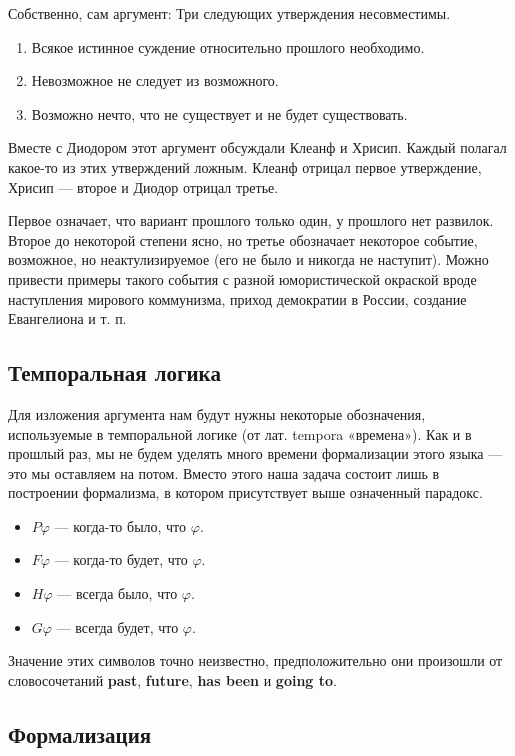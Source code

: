 \documentclass[openany]{book}
\theoremstyle{plain}
\theoremstyle{definition}
\begin{document}
Собственно, сам аргумент:
Три следующих утверждения несовместимы.
\begin{enumerate}
\item Всякое истинное суждение относительно прошлого необходимо.
\item Невозможное не следует из возможного.
\item Возможно нечто, что не существует и не будет существовать.
\end{enumerate}

Вместе с Диодором этот аргумент обсуждали Клеанф и Хрисип. Каждый полагал какое-то из этих утверждений ложным. Клеанф отрицал первое утверждение, Хрисип --- второе и Диодор отрицал третье.

Первое означает, что вариант прошлого только один, у прошлого нет развилок. Второе до некоторой степени ясно, но третье обозначает некоторое событие, возможное, но неактулизируемое (его не было и никогда не наступит). Можно привести примеры такого события с разной юмористической окраской вроде наступления мирового коммунизма, приход демократии в России, создание Евангелиона и т. п.

\subsection{ Темпоральная логика }

Для изложения аргумента нам будут нужны некоторые обозначения, используемые в темпоральной логике (от лат. tempora «времена»). Как и в прошлый раз, мы не будем уделять много времени формализации этого языка — это мы оставляем на потом. Вместо этого наша задача состоит лишь в построении формализма, в котором присутствует выше означенный парадокс.

\begin{itemize}
\item \(P\varphi\) — когда-то было, что \(\varphi\).
\item \(F\varphi\) — когда-то будет, что \(\varphi\).
\item \(H\varphi\) — всегда было, что \(\varphi\).
\item \(G\varphi\) — всегда будет, что \(\varphi\).
\end{itemize}

Значение этих символов точно неизвестно, предположительно они произошли от словосочетаний \textbf{past}, \textbf{future}, \textbf{has been} и \textbf{going to}. 

\subsection{Формализация}
\end{document}
